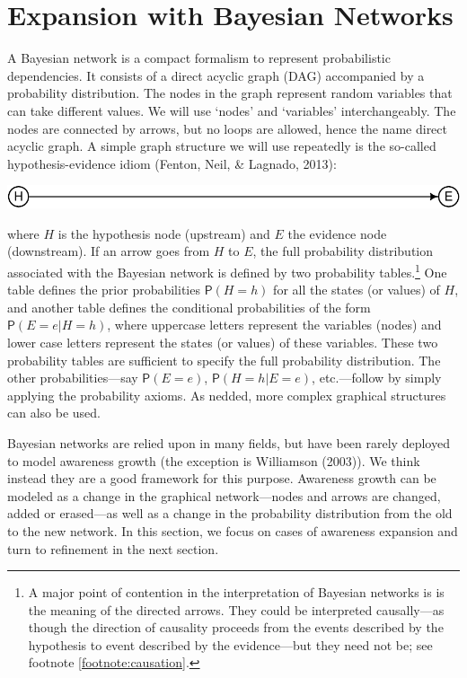\documentclass[
  11pt,
  dvipsnames,enabledeprecatedfontcommands]{scrartcl}
\newcommand{\pr}[1]{\ensuremath{\mathsf{P}(#1)}}
\begin{document}
\hypertarget{expansion-with-bayesian-networks}{%
\section{Expansion with Bayesian
Networks}\label{expansion-with-bayesian-networks}}

A Bayesian network is a compact formalism to represent probabilistic
dependencies. It consists of a direct acyclic graph (DAG) accompanied by
a probability distribution. The nodes in the graph represent random
variables that can take different values. We will use `nodes' and
`variables' interchangeably. The nodes are connected by arrows, but no
loops are allowed, hence the name direct acyclic graph. A simple graph
structure we will use repeatedly is the so-called hypothesis-evidence
idiom (Fenton, Neil, \& Lagnado, 2013):

\begin{center}\includegraphics[width=0.5\linewidth,height=0.5\textheight]{ReplyToSteeleStefansson5_files/figure-latex/heDAG-prel-1} \end{center}

\noindent where \(H\) is the hypothesis node (upstream) and \(E\) the
evidence node (downstream). If an arrow goes from \(H\) to \(E\), the
full probability distribution associated with the Bayesian network is
defined by two probability tables.\footnote{A major point of contention
  in the interpretation of Bayesian networks is is the meaning of the
  directed arrows. They could be interpreted causally---as though the
  direction of causality proceeds from the events described by the
  hypothesis to event described by the evidence---but they need not be;
  see footnote \ref{footnote:causation}.} One table defines the prior
probabilities \(\pr{H=h}\) for all the states (or values) of \(H\), and
another table defines the conditional probabilities of the form
\(\pr{E=e \vert H=h}\), where uppercase letters represent the variables
(nodes) and lower case letters represent the states (or values) of these
variables. These two probability tables are sufficient to specify the
full probability distribution. The other probabilities---say \pr{E=e},
\pr{H=h \vert E=e}, etc.---follow by simply applying the probability
axioms. As nedded, more complex graphical structures can also be used.

Bayesian networks are relied upon in many fields, but have been rarely
deployed to model awareness growth (the exception is Williamson (2003)).
We think instead they are a good framework for this purpose. Awareness
growth can be modeled as a change in the graphical network---nodes and
arrows are changed, added or erased---as well as a change in the
probability distribution from the old to the new network. In this
section, we focus on cases of awareness expansion and turn to refinement
in the next section.
\end{document}
